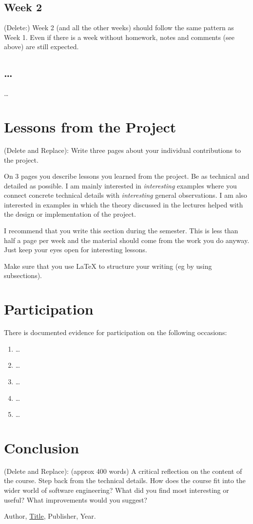 \documentclass{article}
\theoremstyle{theorem}
\theoremstyle{definition}
\theoremstyle{remark}
\begin{document}
\subsection{Week 2}

(Delete:) Week 2 (and all the other weeks) should follow the same pattern as Week 1. Even if there is a week without homework, notes and comments (see above) are still expected.

\subsection{\ldots}

\ldots

\section{Lessons from the Project}

(Delete and Replace): Write three pages about your individual contributions to the project.

On 3 pages you describe lessons you learned from the project. Be as technical and detailed as possible. I am mainly interested in \emph{interesting} examples where you connect concrete technical details with \emph{interesting} general observations. I am also interested in examples in which the theory discussed in the lectures helped with the design or implementation of the project.

I recommend that you write this section during the semester. This is less than half a page per week and the material should come from the work you do anyway. Just keep your eyes open for interesting lessons.

Make sure that you use \LaTeX{} to structure your writing (eg by using subsections).

\section{Participation}

There is documented evidence for participation on the following occasions:
\begin{enumerate}
  \item \ldots
  \item \ldots
  \item \ldots
  \item \ldots
  \item \ldots
\end{enumerate}

\section{Conclusion}\label{conclusion}

(Delete and Replace): (approx 400 words) A critical reflection on the content of the course. Step back from the technical details. How does the course fit into the wider world of software engineering? What did you find most interesting or useful? What improvements would you suggest?

\begin{thebibliography}{99}
 Author, \href{https://en.wikipedia.org/wiki/LaTeX}{Title}, Publisher, Year.
\end{thebibliography}
\end{document}
